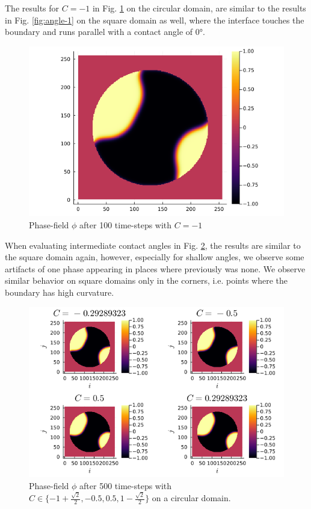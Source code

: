 \documentclass{mimosis}
\begin{document}
The results for \(C=-1\) in Fig. \ref{fig:angle-1c} on the circular domain, are similar to the results in Fig. \ref{fig:angle-1} on the square domain as well, where the interface touches the boundary and runs parallel with a contact angle of 0°.
\begin{figure}[htbp]
\centering
\includegraphics[width=.9\linewidth]{images/angle-1c.png}
\caption{\label{fig:angle-1c}Phase-field \(\phi\) after 100 time-steps with \(C=-1\)}
\end{figure}

When evaluating intermediate contact angles in Fig. \ref{fig:angle-multiplec}, the results are similar to the square domain again, however, especially for shallow angles, we observe some artifacts of one phase appearing in places where previously was none. We observe similar behavior on square domains only in the corners, i.e. points where the boundary has high curvature.
\begin{figure}[htbp]
\centering
\includegraphics[width=.9\linewidth]{images/angle-multiplec.png}
\caption{\label{fig:angle-multiplec}Phase-field \(\phi\) after 500 time-steps with \(C \in \{-1 + \frac{\sqrt{2}}{2} , -0.5 , 0.5 , 1 - \frac{\sqrt{2}}{2} \}\) on a circular domain.}
\end{figure}
\end{document}
